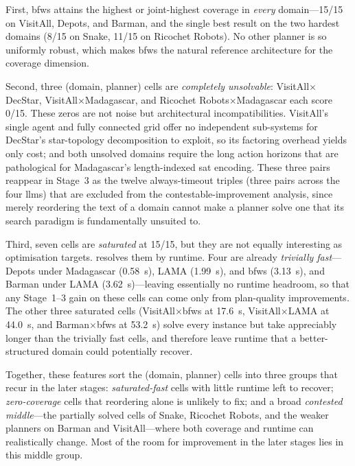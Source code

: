 First, \gls{bfws} attains the highest or joint-highest coverage in \emph{every} domain---15/15 on VisitAll, Depots, and Barman, and the single best result on the two hardest domains (8/15 on Snake, 11/15 on Ricochet Robots).
No other planner is so uniformly robust, which makes \gls{bfws} the natural reference architecture for the coverage dimension.

Second, three (domain, planner) cells are \emph{completely unsolvable}: VisitAll$\times$DecStar, VisitAll$\times$Madagascar, and Ricochet Robots$\times$Madagascar each score 0/15.
These zeros are not noise but architectural incompatibilities.
VisitAll's single agent and fully connected grid offer no independent sub-systems for DecStar's star-topology decomposition to exploit, so its factoring overhead yields only cost; and both unsolved domains require the long action horizons that are pathological for Madagascar's length-indexed \gls{sat} encoding.
These three pairs reappear in Stage~3 as the twelve always-timeout triples (three pairs across the four \glspl{llm}) that are excluded from the contestable-improvement analysis, since merely reordering the text of a domain cannot make a planner solve one that its search paradigm is fundamentally unsuited to.

Third, seven cells are \emph{saturated} at 15/15, but they are not equally interesting as optimisation targets.
 resolves them by runtime.
Four are already \emph{trivially fast}---Depots under Madagascar (0.58~s), LAMA (1.99~s), and \gls{bfws} (3.13~s), and Barman under LAMA (3.62~s)---leaving essentially no runtime headroom, so that any Stage~1--3 gain on these cells can come only from plan-quality improvements.
The other three saturated cells (VisitAll$\times$\gls{bfws} at 17.6~s, VisitAll$\times$LAMA at 44.0~s, and Barman$\times$\gls{bfws} at 53.2~s) solve every instance but take appreciably longer than the trivially fast cells, and therefore leave runtime that a better-structured domain could potentially recover.

Together, these features sort the (domain, planner) cells into three groups that recur in the later stages: \emph{saturated-fast} cells with little runtime left to recover; \emph{zero-coverage} cells that reordering alone is unlikely to fix; and a broad \emph{contested middle}---the partially solved cells of Snake, Ricochet Robots, and the weaker planners on Barman and VisitAll---where both coverage and runtime can realistically change. Most of the room for improvement in the later stages lies in this middle group.

